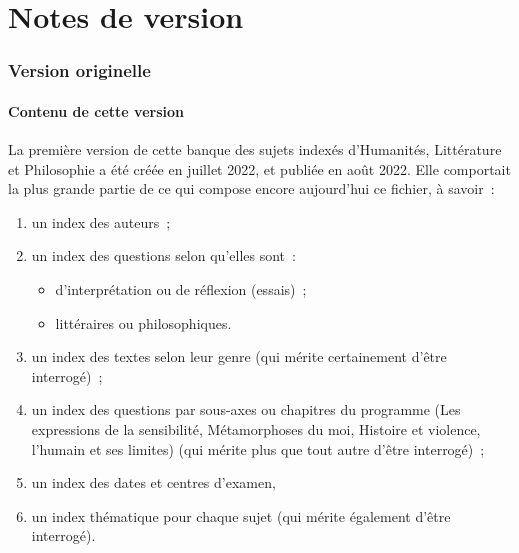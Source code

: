 \setcounter{chapter}{0}
\setcounter{section}{1}
\setcounter{subsection}{-1}
\chapter{Notes de version}

\subsection{Version originelle}

\subsubsection{Contenu de cette version}
La première version de cette banque des sujets indexés d'Humanités, Littérature et Philosophie a été créée en juillet 2022, et publiée en août 2022. Elle comportait la plus grande partie de ce qui compose encore aujourd'hui ce fichier, à savoir~:

\begin{enumerate}
\item un index des auteurs~;

\item un index des questions selon qu'elles sont~:

\begin{itemize}
\item d'interprétation ou de réflexion (essais)~;

\item littéraires ou philosophiques.
\end{itemize}

\item un index des textes selon leur genre (qui mérite certainement d'être interrogé)~;

\item  un index des questions par sous-axes ou chapitres du programme (Les expressions de la sensibilité, Métamorphoses du moi, Histoire et violence, l'humain et ses limites) (qui mérite plus que tout autre d'être interrogé)~;

\item un index des dates et centres d'examen,

\item un index thématique pour chaque sujet (qui mérite également d'être interrogé).
\end{enumerate}

